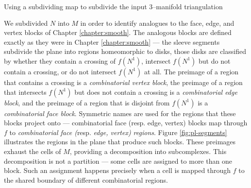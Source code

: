 \begin{algorithm}[h!]
	\caption{Using a subdividing map to subdivide the input 3--manifold triangulation}
	\label{alg:subdividing-manifold}
\end{algorithm}


We subdivided $N$ into $M$ in order to identify analogues to the face, edge, and vertex blocks of Chapter \ref{chapter:smooth}.
The analogous blocks are defined exactly as they were in Chapter \ref{chapter:smooth} --- the sleeve segments subdivide the plane into regions homeomorphic to disks, those disks are classified by whether they contain a crossing of $f(N^1)$, intersect $f(N^1)$ but do not contain a crossing, or do not intersect $f(N^1)$ at all.
The preimage of a region that contains a crossing is a \emph{combinatorial vertex block}, the preimage of a region that intersects $f(N^1)$ but does not contain a crossing is a \emph{combinatorial edge block}, and the preimage of a region that is disjoint from $f(N^1)$ is a \emph{combinatorial face block}.
Symmetric names are used for the regions that these blocks project onto --- combinatorial face (resp. edge, vertex) blocks map through $f$ to \emph{combinatorial face (}resp. \emph{edge, vertex) regions}.
Figure \ref{fig:pl-segments} illustrates the regions in the plane that produce such blocks.
These preimages exhaust the cells of $M$, providing a decomposition into subcomplexes.
This decomposition is not a partition --- some cells are assigned to more than one block.
Such an assignment happens precisely when a cell is mapped through $f$ to the shared boundary of different combinatorial regions.

